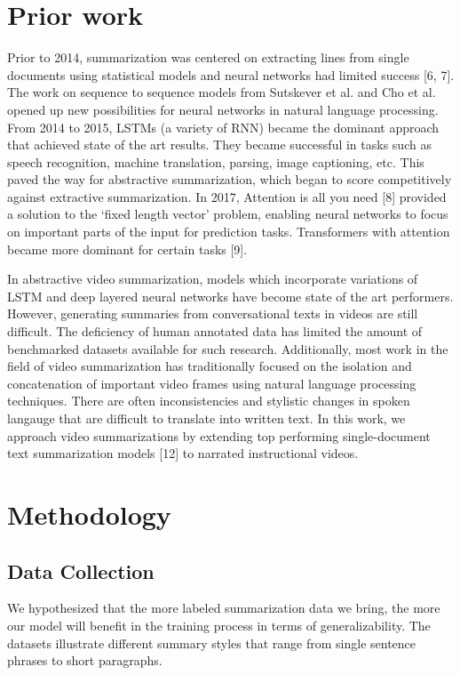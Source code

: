\documentclass{article}
\begin{document}
\section{Prior work}

Prior to 2014, summarization was centered on extracting lines from single documents using statistical models and neural networks had limited success [6, 7]. The work on sequence to sequence models from Sutskever et al. and Cho et al. opened up new possibilities for neural networks in natural language processing. From 2014 to 2015, LSTMs (a variety of RNN) became the dominant approach that achieved state of the art results. They became successful in tasks such as speech recognition, machine translation, parsing, image captioning, etc. This paved the way for abstractive summarization, which began to score competitively against extractive summarization. In 2017, Attention is all you need [8] provided a solution to the ‘fixed length vector’ problem, enabling neural networks to focus on important parts of the input for prediction tasks. Transformers with attention became more dominant for certain tasks [9].

In abstractive video summarization, models which incorporate variations of LSTM and deep layered neural networks have become state of the art performers. However, generating summaries from conversational texts in videos are still difficult. The deficiency of human annotated data has limited the amount of benchmarked datasets available for such research. Additionally, most work in the field of video summarization has traditionally focused on the isolation and concatenation of important video frames using natural language processing techniques. There are often inconsistencies and stylistic changes in spoken langauge that are difficult to translate into written text. In this work, we approach video summarizations by extending top performing single-document text summarization models [12] to narrated instructional videos.

 
\section{Methodology}

\subsection{Data Collection}
We hypothesized that the more labeled summarization data we bring, the more our model will benefit in the training process in terms of generalizability. The datasets illustrate different summary styles that range from single sentence phrases to short paragraphs. 
\end{document}
